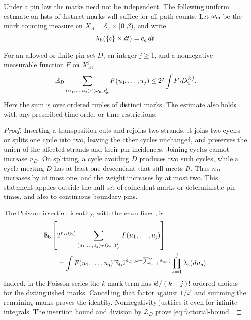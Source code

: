 Under a pin law the marks need not be independent.  The following
uniform estimate on lists of distinct marks will suffice for all path
counts.  Let $\omega_{\rm m}$ be the mark counting measure on
$X_\Lambda=\mathcal E_\Lambda\times[0,\beta)$, and write
\[
             \lambda_{\rm b}(\{e\}\times dt)=c_e\,dt.
\]

\begin{lemma}\label{lem:factorial}
For an allowed or finite pin set $D$, an integer $j\ge1$, and a
nonnegative measurable function $F$ on $X_\Lambda^j$,
\begin{equation}\label{eq:factorial-bound}
 \mathbb E_D\sum_{(u_1,\ldots,u_j)\in(\omega_{\rm m})^j_{\ne}}
                         F(u_1,\ldots,u_j)
 \le 2^j\int F\,d\lambda_{\rm b}^{\otimes j}.
\end{equation}
Here the sum is over ordered tuples of distinct marks.  The estimate
also holds with any prescribed time order or time restrictions.
\end{lemma}

\begin{proof}
Inserting a transposition cuts and rejoins two strands.  It joins two
cycles or splits one cycle into two, leaving the other cycles
unchanged, and preserves the union of the affected strands and their
pin incidences.  Joining cycles cannot increase $n_D$.  On splitting,
a cycle avoiding $D$ produces two such cycles, while a cycle meeting
$D$ has at least one descendant that still meets $D$.  Thus $n_D$
increases by at most one, and the weight increases by at most two.
This statement
applies outside the null set of coincident marks or deterministic pin
times, and also to continuous boundary pins.

The Poisson insertion identity, with the seam fixed, is
\begin{align*}
 &\mathbb E_{\rm b}\left[2^{n_D(\omega)}
     \sum_{(u_1,\ldots,u_j)\in(\omega_{\rm m})^j_{\ne}}F(u_1,\ldots,u_j)
                                                        \right]\\
 &\qquad=\int F(u_1,\ldots,u_j)\,
       \mathbb E_{\rm b}2^{n_D(\omega+\sum_{a=1}^j\delta_{u_a})}
                          \prod_{a=1}^j\lambda_{\rm b}(du_a).
\end{align*}
Indeed, in the Poisson series the $k$-mark term has
$k!/(k-j)!$ ordered choices for the distinguished marks.  Cancelling
that factor against $1/k!$ and summing the remaining marks proves the
identity.  Nonnegativity justifies it even for infinite integrals.
The insertion bound and division by $\mathcal Z_D$ prove
\eqref{eq:factorial-bound}.
\end{proof}

